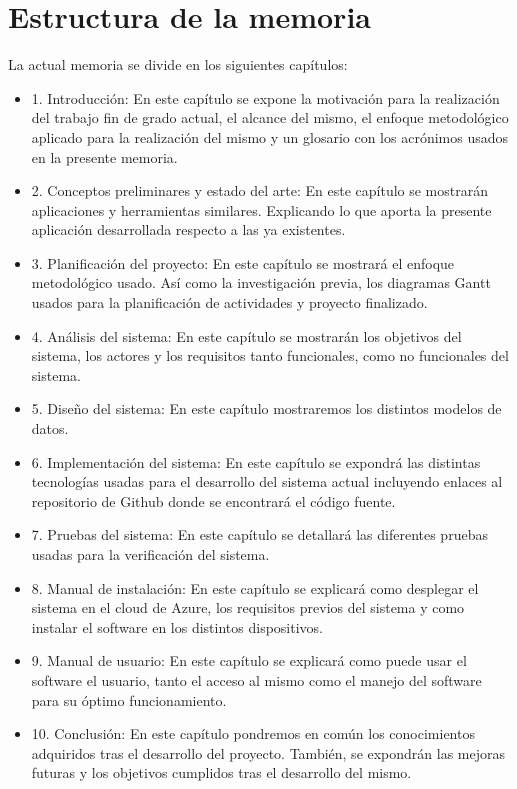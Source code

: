 \section{Estructura de la memoria}
La actual memoria se divide en los siguientes capítulos:
\begin{itemize}
    \item 1. Introducción: En este capítulo se expone la motivación para la realización del trabajo fin de grado actual, el alcance del mismo, el enfoque metodológico aplicado para la realización del mismo y un glosario con los acrónimos usados en la presente memoria.
    \item 2. Conceptos preliminares y estado del arte: En este capítulo se mostrarán aplicaciones y herramientas similares. Explicando lo que aporta la presente aplicación desarrollada respecto a las ya existentes.
    \item 3. Planificación del proyecto: En este capítulo se mostrará el enfoque metodológico usado. Así como la investigación previa, los diagramas Gantt usados para la planificación de actividades y proyecto finalizado.
    \item 4. Análisis del sistema: En este capítulo se mostrarán los objetivos del sistema, los actores y los requisitos tanto funcionales, como no funcionales del sistema.
    \item 5. Diseño del sistema: En este capítulo mostraremos los distintos modelos de datos.
    \item 6. Implementación del sistema: En este capítulo se expondrá las distintas tecnologías usadas para el desarrollo del sistema actual incluyendo enlaces al repositorio de Github donde se encontrará el código fuente.
    \item 7. Pruebas del sistema: En este capítulo se detallará las diferentes pruebas usadas para la verificación del sistema.
    \item 8. Manual de instalación: En este capítulo se explicará como desplegar el sistema en el cloud de Azure, los requisitos previos del sistema y como instalar el software en los distintos dispositivos.
    \item 9. Manual de usuario: En este capítulo se explicará como puede usar el software el usuario, tanto el acceso al mismo como el manejo del software para su óptimo funcionamiento.
    \item 10. Conclusión: En este capítulo pondremos en común los conocimientos adquiridos tras el desarrollo del proyecto. También, se expondrán las mejoras futuras y los objetivos cumplidos tras el desarrollo del mismo.
\end{itemize}